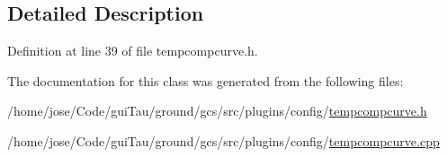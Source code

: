 \subsection{Detailed Description}


Definition at line 39 of file tempcompcurve.\-h.



The documentation for this class was generated from the following files\-:\begin{DoxyCompactItemize}
\item 
/home/jose/\-Code/gui\-Tau/ground/gcs/src/plugins/config/\hyperlink{tempcompcurve_8h}{tempcompcurve.\-h}\item 
/home/jose/\-Code/gui\-Tau/ground/gcs/src/plugins/config/\hyperlink{tempcompcurve_8cpp}{tempcompcurve.\-cpp}\end{DoxyCompactItemize}
